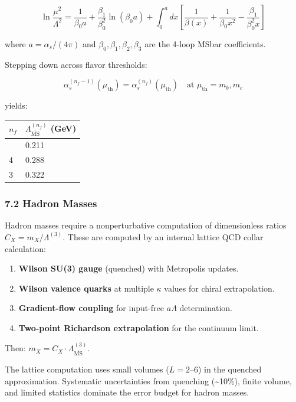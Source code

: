 \[\ln\frac{\mu^2}{\Lambda^2} = \frac{1}{\beta_0 a} + \frac{\beta_1}{\beta_0^2}\ln(\beta_0 a) + \int_0^a dx\left[\frac{1}{\beta(x)} + \frac{1}{\beta_0 x^2} - \frac{\beta_1}{\beta_0^2 x}\right]\]

where \(a = \alpha_s/(4\pi)\) and \(\beta_0, \beta_1, \beta_2, \beta_3\) are the 4-loop MSbar coefficients.

Stepping down across flavor thresholds:

\[\alpha_s^{(n_f-1)}(\mu_{\text{th}}) = \alpha_s^{(n_f)}(\mu_{\text{th}}) \quad \text{at } \mu_{\text{th}} = m_b, m_c\]

yields:

{\def\LTcaptype{none} %
\begin{longtable}[]{@{}ll@{}}
\toprule\noalign{}
\(n_f\) & \(\Lambda_{\overline{\text{MS}}}^{(n_f)}\) (GeV) \\
\midrule\noalign{}
\endhead
\bottomrule\noalign{}
\endlastfoot
5 & 0.211 \\
4 & 0.288 \\
3 & 0.322 \\
\end{longtable}
}

\subsubsection{7.2 Hadron Masses}\label{72-hadron-masses}

Hadron masses require a nonperturbative computation of dimensionless ratios \(C_X = m_X / \Lambda^{(3)}\). These are computed by an internal lattice QCD collar calculation:

\begin{enumerate}
\def\labelenumi{\arabic{enumi}.}
\tightlist
\item
  \textbf{Wilson SU(3) gauge} (quenched) with Metropolis updates.
\item
  \textbf{Wilson valence quarks} at multiple \(\kappa\) values for chiral extrapolation.
\item
  \textbf{Gradient-flow coupling} for input-free \(a\Lambda\) determination.
\item
  \textbf{Two-point Richardson extrapolation} for the continuum limit.
\end{enumerate}

Then: \(m_X = C_X \cdot \Lambda_{\overline{\text{MS}}}^{(3)}\).

The lattice computation uses small volumes (\(L = 2\)--\(6\)) in the quenched approximation. Systematic uncertainties from quenching (\textasciitilde10\%), finite volume, and limited statistics dominate the error budget for hadron masses.

